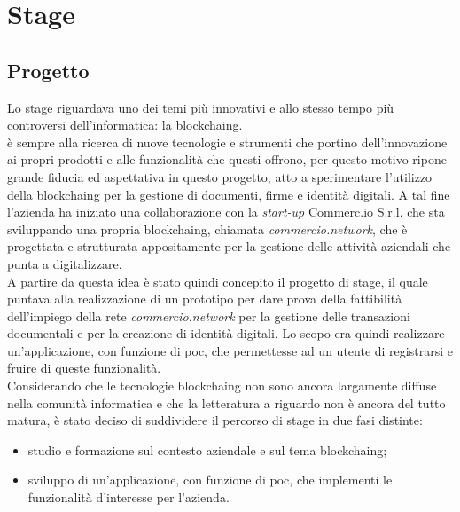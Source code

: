 
\chapter{Stage}
\label{cap:stage}

\section{Progetto}

Lo stage riguardava uno dei temi più innovativi e allo stesso tempo più controversi dell'informatica: la \gls{blockchaing}.\\
\myCompany{} \companyTitle{} è sempre alla ricerca di nuove tecnologie e strumenti che portino dell'innovazione ai propri prodotti e alle funzionalità che questi offrono, per questo motivo ripone grande fiducia ed aspettativa in questo progetto, atto a sperimentare l'utilizzo della \gls{blockchaing} per la gestione di documenti, firme e identità digitali.
A tal fine l'azienda ha iniziato una collaborazione con la \textit{start-up} Commerc.io S.r.l. che sta sviluppando una propria \gls{blockchaing}, chiamata \textit{commercio.network}, che è progettata e strutturata appositamente per la gestione delle attività aziendali che \myCompany{} \companyTitle{} punta a digitalizzare.\\
A partire da questa idea è stato quindi concepito il progetto di stage, il quale puntava alla realizzazione di un prototipo per dare prova della fattibilità dell'impiego della rete \textit{commercio.network} per la gestione delle transazioni documentali e per la creazione di identità digitali. Lo scopo era quindi realizzare un'applicazione, con funzione di \gls{poc}, che permettesse ad un utente di registrarsi e fruire di queste funzionalità.\\
Considerando che le tecnologie \gls{blockchaing} non sono ancora largamente diffuse nella comunità informatica e che la letteratura a riguardo non è ancora del tutto matura, è stato deciso di suddividere il percorso di stage in due fasi distinte:

\begin{itemize}
	\item studio e formazione sul contesto aziendale e sul tema \gls{blockchaing};
	\item sviluppo di un'applicazione, con funzione di \gls{poc}, che implementi le funzionalità d'interesse per l'azienda.
\end{itemize}

